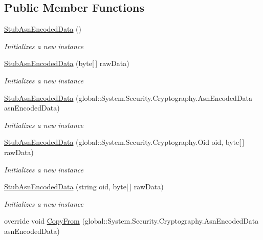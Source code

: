 \subsection*{Public Member Functions}
\begin{DoxyCompactItemize}
\item 
\hyperlink{class_system_1_1_security_1_1_cryptography_1_1_fakes_1_1_stub_asn_encoded_data_a4f8b11c2c2e68013c35703be9b204693}{Stub\-Asn\-Encoded\-Data} ()
\begin{DoxyCompactList}\small\item\em Initializes a new instance\end{DoxyCompactList}\item 
\hyperlink{class_system_1_1_security_1_1_cryptography_1_1_fakes_1_1_stub_asn_encoded_data_a4524b2d2b7adc898cd8c02432301afeb}{Stub\-Asn\-Encoded\-Data} (byte\mbox{[}$\,$\mbox{]} raw\-Data)
\begin{DoxyCompactList}\small\item\em Initializes a new instance\end{DoxyCompactList}\item 
\hyperlink{class_system_1_1_security_1_1_cryptography_1_1_fakes_1_1_stub_asn_encoded_data_a9075db2b2c7e3cfe1f5e512b8404fd17}{Stub\-Asn\-Encoded\-Data} (global\-::\-System.\-Security.\-Cryptography.\-Asn\-Encoded\-Data asn\-Encoded\-Data)
\begin{DoxyCompactList}\small\item\em Initializes a new instance\end{DoxyCompactList}\item 
\hyperlink{class_system_1_1_security_1_1_cryptography_1_1_fakes_1_1_stub_asn_encoded_data_a8289c924617f45d91ef062a32c5ad850}{Stub\-Asn\-Encoded\-Data} (global\-::\-System.\-Security.\-Cryptography.\-Oid oid, byte\mbox{[}$\,$\mbox{]} raw\-Data)
\begin{DoxyCompactList}\small\item\em Initializes a new instance\end{DoxyCompactList}\item 
\hyperlink{class_system_1_1_security_1_1_cryptography_1_1_fakes_1_1_stub_asn_encoded_data_a49a0c0fc6c072e8f5157d245578c687b}{Stub\-Asn\-Encoded\-Data} (string oid, byte\mbox{[}$\,$\mbox{]} raw\-Data)
\begin{DoxyCompactList}\small\item\em Initializes a new instance\end{DoxyCompactList}\item 
override void \hyperlink{class_system_1_1_security_1_1_cryptography_1_1_fakes_1_1_stub_asn_encoded_data_a3df8e0ae90bc4a1a43cb5b337e4428e7}{Copy\-From} (global\-::\-System.\-Security.\-Cryptography.\-Asn\-Encoded\-Data asn\-Encoded\-Data)

\end{DoxyCompactItemize}
